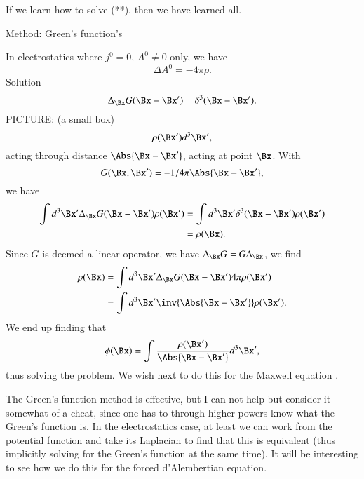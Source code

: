If we learn how to solve (**), then we have learned all.

Method: Green's function's

In electrostatics where \(j^0 = 0\), \(A^0 \ne 0\) only, we have
%
\begin{equation}\label{eqn:relativisticElectrodynamicsL17b:330}
\Delta A^0 = -4 \pi \rho.
\end{equation}
Solution
%
\begin{equation}\label{eqn:relativisticElectrodynamicsL17b:350}
\Delta_{\Bx} G(\Bx - \Bx') = \delta^3( \Bx - \Bx').
\end{equation}
%
PICTURE: (a small box)
%
\begin{equation}\label{eqn:relativisticElectrodynamicsL17b:370}
\rho(\Bx') d^3 \Bx',
\end{equation}
acting through distance \(\Abs{\Bx - \Bx'}\), acting at point \(\Bx\).  With
\begin{dmath}\label{eqn:relativisticElectrodynamicsL17b:371}
G(\Bx, \Bx') = -1/4 \pi\Abs{\Bx - \Bx'},
\end{dmath}
we have
%
\begin{equation}\label{eqn:relativisticElectrodynamicsL17b:410}
\begin{aligned}
\int d^3 \Bx' \Delta_{\Bx} G(\Bx - \Bx') \rho(\Bx')
&= \int d^3 \Bx' \delta^3( \Bx - \Bx') \rho(\Bx') \\
&= \rho(\Bx).
\end{aligned}
\end{equation}
Since \(G\) is deemed a linear operator, we have \(\Delta_\Bx G = G \Delta_\Bx\), we find
%
\begin{equation}\label{eqn:relativisticElectrodynamicsL17b:430}
\begin{aligned}
\rho(\Bx)
&=
\int d^3 \Bx' \Delta_{\Bx} G(\Bx - \Bx') 4 \pi \rho(\Bx') \\
&=
\int d^3 \Bx' \inv{\Abs{\Bx - \Bx'}} \rho(\Bx').
\end{aligned}
\end{equation}
We end up finding that
%
\begin{equation}\label{eqn:relativisticElectrodynamicsL17b:390}
\phi(\Bx) = \int \frac{\rho(\Bx')}{\Abs{\Bx - \Bx'}} d^3 \Bx',
\end{equation}
thus solving the problem.  We wish next to do this for the Maxwell equation .

The Green's function method is effective, but I can not help but consider it somewhat of a cheat, since one has to through higher powers know what the Green's function is.  In the electrostatics case, at least we can work from the potential function and take its Laplacian to find that this is equivalent (thus implicitly solving for the Green's function at the same time).  It will be interesting to see how we do this for the forced d'Alembertian equation.
